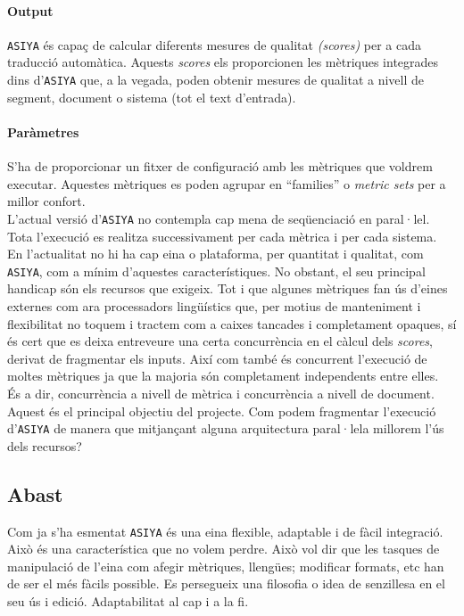 \documentclass[11pt,a4paper]{article}
\begin{document}
\paragraph{Output} \texttt{ASIYA} és capaç de calcular diferents mesures de qualitat \textit{(scores)} per a cada traducció automàtica. Aquests \textit{scores} els proporcionen les mètriques integrades dins d'\texttt{ASIYA} que, a la vegada, poden obtenir mesures de qualitat a nivell de segment, document o sistema (tot el text d'entrada).

\paragraph{Paràmetres} S'ha de proporcionar un fitxer de configuració amb les mètriques que voldrem executar. Aquestes mètriques es poden agrupar en ``families'' o \textit{metric sets} per a millor confort.
\\

L'actual versió d'\texttt{ASIYA} no contempla cap mena de seqüenciació en paral·lel. Tota l'execució es realitza successivament per cada mètrica i per cada sistema.
\\

En l'actualitat no hi ha cap eina o plataforma, per quantitat i qualitat, com \texttt{ASIYA}, com a mínim d'aquestes característiques. No obstant, el seu principal handicap són els recursos que exigeix. Tot i que algunes mètriques fan ús d'eines externes com ara processadors lingüístics que, per motius de manteniment i flexibilitat no toquem i tractem com a caixes tancades i completament opaques, sí és cert que es deixa entreveure una certa concurrència en el càlcul dels \textit{scores}, derivat de fragmentar els inputs. Així com també és concurrent l'execució de moltes mètriques ja que la majoria són completament independents entre elles.
\\

És a dir, concurrència a nivell de mètrica i concurrència a nivell de document.
\\

Aquest és el principal objectiu del projecte. Com podem fragmentar l'execució d'\texttt{ASIYA} de manera que mitjançant alguna arquitectura paral·lela millorem l'ús dels recursos?

\subsection{Abast}

Com ja s'ha esmentat \texttt{ASIYA} és una eina flexible, adaptable i de fàcil integració. Això és una característica que no volem perdre.  Això vol dir que les tasques de manipulació de l'eina com afegir mètriques, llengües; modificar formats, etc han de ser el més fàcils possible. Es persegueix una filosofia o idea de senzillesa en el seu ús i edició. Adaptabilitat al cap i a la fi.
\\
\end{document}
